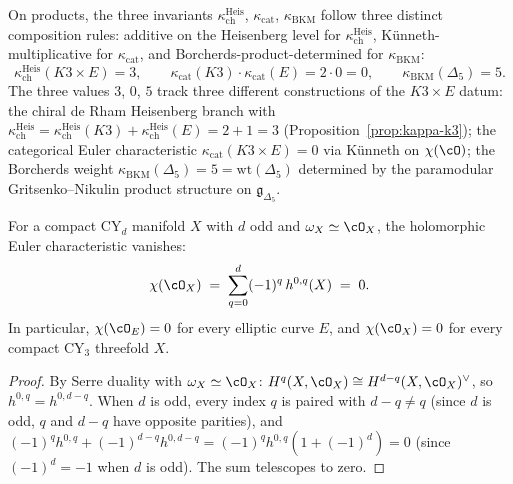 \begin{proposition}
\label{prop:kappa-non-multiplicative}
On products, the three invariants $\kappa_{\mathrm{ch}}^{\mathrm{Heis}}$,
$\kappa_{\mathrm{cat}}$, $\kappa_{\mathrm{BKM}}$ follow three distinct
composition rules: additive on the Heisenberg level for
$\kappa_{\mathrm{ch}}^{\mathrm{Heis}}$, K\"unneth-multiplicative for
$\kappa_{\mathrm{cat}}$, and Borcherds-product-determined for
$\kappa_{\mathrm{BKM}}$:
\[
 \kappa_{\mathrm{ch}}^{\mathrm{Heis}}(K3 \times E) = 3, \qquad
 \kappa_{\mathrm{cat}}(K3) \cdot \kappa_{\mathrm{cat}}(E) = 2 \cdot 0 = 0, \qquad
 \kappa_{\mathrm{BKM}}(\Delta_5) = 5.
\]
The three values $3$, $0$, $5$ track three different constructions of
the $K3 \times E$ datum: the chiral de Rham Heisenberg branch with
$\kappa_{\mathrm{ch}}^{\mathrm{Heis}} = \kappa_{\mathrm{ch}}^{\mathrm{Heis}}(K3) + \kappa_{\mathrm{ch}}^{\mathrm{Heis}}(E) = 2 + 1 = 3$
(Proposition~\ref{prop:kappa-k3}); the categorical Euler characteristic
$\kappa_{\mathrm{cat}}(K3 \times E) = 0$ via K\"unneth on
$\chi(\cO)$; the Borcherds weight $\kappa_{\mathrm{BKM}}(\Delta_5) = 5 = \mathrm{wt}(\Delta_5)$
determined by the paramodular Gritsenko--Nikulin product structure
on $\mathfrak{g}_{\Delta_5}$.
\end{proposition}


\begin{proposition}[\texorpdfstring{$\chi(\cO_X) = 0$}{chi(O-X) = 0} for CY manifolds of odd dimension]
\label{prop:chi-O-vanishes-odd-d}
For a compact CY$_d$ manifold $X$ with $d$ odd and $\omega_X \simeq \cO_X$, the holomorphic Euler characteristic vanishes:
\[
 \chi(\cO_X) \;=\; \sum_{q=0}^{d} (-1)^q\, h^{0,q}(X) \;=\; 0.
\]
In particular, $\chi(\cO_E) = 0$ for every elliptic curve $E$, and $\chi(\cO_X) = 0$ for every compact CY$_3$ threefold $X$.
\end{proposition}

\begin{proof}
By Serre duality with $\omega_X \simeq \cO_X$: $H^q(X, \cO_X) \cong H^{d-q}(X, \cO_X)^\vee$, so $h^{0,q} = h^{0,d-q}$. When $d$ is odd, every index $q$ is paired with $d-q \neq q$ (since $d$ is odd, $q$ and $d-q$ have opposite parities), and $(-1)^q h^{0,q} + (-1)^{d-q} h^{0,d-q} = (-1)^q h^{0,q} (1 + (-1)^d) = 0$ (since $(-1)^d = -1$ when $d$ is odd). The sum telescopes to zero.
\end{proof}

